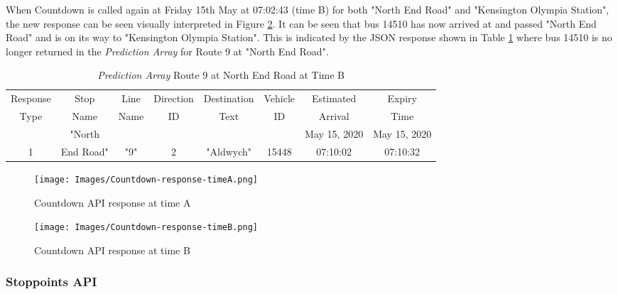 When Countdown is called again at Friday 15th May at 07:02:43 (time B) for both "North End Road" and "Kensington Olympia Station", the new response can be seen visually interpreted in Figure \ref{fig:countdown-response-timeB}. It can be seen that bus 14510 has now arrived at and passed "North End Road" and is on its way to "Kensington Olympia Station". This is indicated by the JSON response shown in Table \ref{table:prediction-array-stopa-updated} where bus 14510 is no longer returned in the \textit{Prediction Array} for Route 9 at "North End Road".

\begin{table}[H]
    \centering
    \setlength\tabcolsep{2pt}
    \begin{tabular}{|c|c|c|c|c|c|c|c|}
        \hline
          Response & Stop   &   Line & Direction & Destination & Vehicle & Estimated & Expiry \\[-3pt]
           Type & Name &    Name & ID &  Text & ID & Arrival &  Time \\
        \hline
             & "North &  &  &  &  & May 15, 2020 & May 15, 2020 \\[-3pt]
            1 & End Road" & "9" & 2 & "Aldwych" & 15448 & 07:10:02 & 07:10:32 \\
        \hline
        \end{tabular}
    \caption{\textit{Prediction Array} Route 9 at North End Road at Time B}
    \label{table:prediction-array-stopa-updated}
\end{table}

\begin{figure}[H]
\begin{center}
    \texttt{[image: Images/Countdown-response-timeA.png]}
    \caption{Countdown API response at time A}
    \label{fig:countdown-response-timeA}
\end{center}
\end{figure}

\begin{figure}[H]
\begin{center}
    \texttt{[image: Images/Countdown-response-timeB.png]}
    \caption{Countdown API response at time B}
    \label{fig:countdown-response-timeB}
\end{center}
\end{figure}

\subsubsection{Stoppoints API}


